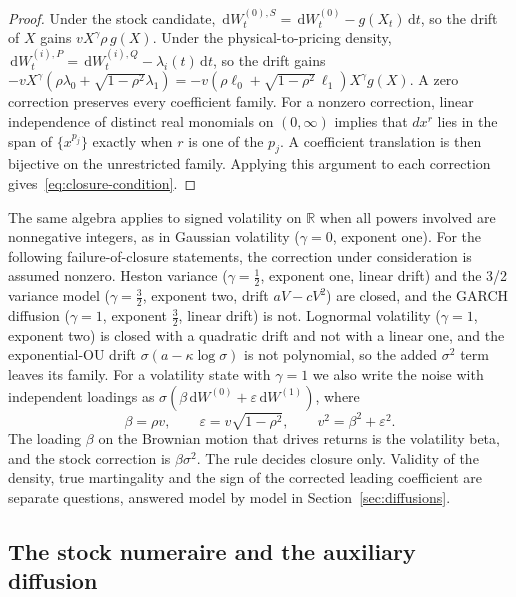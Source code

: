 \documentclass[11pt,a4paper]{article}
\theoremstyle{definition}
\theoremstyle{remark}
\newcommand{\RR}{\mathbb{R}}
\newcommand{\dd}{\,\mathrm{d}}
\begin{document}
\begin{proof}
Under the stock candidate, \(\dd W_t^{(0),S}=\dd W_t^{(0)}-g(X_t)\dd t\), so the drift of \(X\) gains \(vX^{\gamma}\rho\,g(X)\). Under the physical-to-pricing density, \(\dd W_t^{(i),P}=\dd W_t^{(i),Q}-\lambda_i(t)\dd t\), so the drift gains \(-vX^{\gamma}(\rho\lambda_0+\sqrt{1-\rho^2}\lambda_1)=-v(\rho\ell_0+\sqrt{1-\rho^2}\,\ell_1)X^{\gamma}g(X)\). A zero correction preserves every coefficient family. For a nonzero correction, linear independence of distinct real monomials on \((0,\infty)\) implies that \(dx^r\) lies in the span of \(\{x^{p_j}\}\) exactly when \(r\) is one of the \(p_j\). A coefficient translation is then bijective on the unrestricted family. Applying this argument to each correction gives~\eqref{eq:closure-condition}.
\end{proof}

The same algebra applies to signed volatility on \(\RR\) when all powers involved are nonnegative integers, as in Gaussian volatility (\(\gamma=0\), exponent one). For the following failure-of-closure statements, the correction under consideration is assumed nonzero. Heston variance (\(\gamma=\tfrac12\), exponent one, linear drift) and the 3/2 variance model (\(\gamma=\tfrac32\), exponent two, drift \(aV-cV^2\)) are closed, and the GARCH diffusion (\(\gamma=1\), exponent \(\tfrac32\), linear drift) is not. Lognormal volatility (\(\gamma=1\), exponent two) is closed with a quadratic drift and not with a linear one, and the exponential-OU drift \(\sigma(a-\kappa\log\sigma)\) is not polynomial, so the added \(\sigma^2\) term leaves its family. For a volatility state with \(\gamma=1\) we also write the noise with independent loadings as \(\sigma(\beta\dd W^{(0)}+\varepsilon\dd W^{(1)})\), where
\begin{equation}
 \beta=\rho v,\qquad \varepsilon=v\sqrt{1-\rho^2},\qquad v^2=\beta^2+\varepsilon^2.
 \label{eq:loading-bridge}
\end{equation}
The loading \(\beta\) on the Brownian motion that drives returns is the volatility beta, and the stock correction is \(\beta\sigma^2\). The rule decides closure only. Validity of the density, true martingality and the sign of the corrected leading coefficient are separate questions, answered model by model in Section~\ref{sec:diffusions}.

\subsection{The stock numeraire and the auxiliary diffusion}
\label{sec:stock-numeraire}
\end{document}
